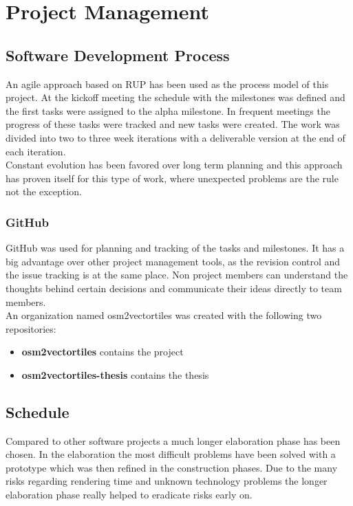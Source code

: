 \chapter{Project Management}\label{project-management}

\section{Software Development Process}

An agile approach based on RUP has been used as the process model of this project.
At the kickoff meeting the schedule with the milestones was defined and the first tasks were assigned to the alpha milestone.
In frequent meetings the progress of these tasks were tracked and new tasks were created.
The work was divided into two to three week iterations with a deliverable version at the end of each iteration.\\
Constant evolution has been favored over long term planning and this approach has proven itself for this type of work,
where unexpected problems are the rule not the exception.

\subsection{GitHub}\label{github}
GitHub was used for planning and tracking of the tasks and milestones.
It has a big advantage over other project management tools, as the revision control and the issue tracking is at the same place.
Non project members can understand the thoughts behind certain decisions and communicate their ideas directly to team members.\\
An organization named osm2vectortiles was created with the following two repositories:

\begin{itemize}
\item
  \textbf{osm2vectortiles} contains the project\cite{pm_1_github_2015}
\item
  \textbf{osm2vectortiles-thesis} contains the thesis\cite{pm_2_github_2015}
\end{itemize}

\section{Schedule}

Compared to other software projects a much longer elaboration phase has been chosen. In the elaboration the most difficult problems have been solved with a prototype which was then refined in the construction phases. Due to the many risks regarding rendering time and unknown technology problems the longer elaboration phase really helped to eradicate risks early on.

